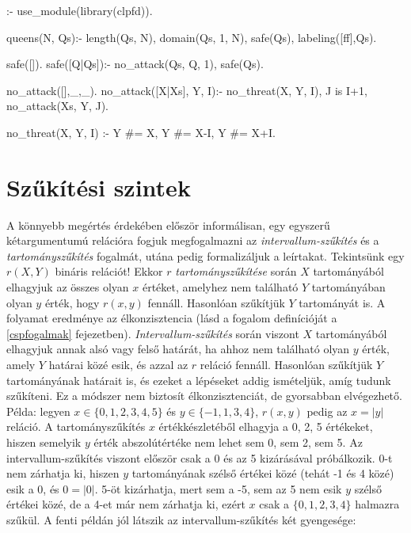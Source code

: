 \begin{prologcode}
:- use_module(library(clpfd)).

queens(N, Qs):-
  length(Qs, N), domain(Qs, 1, N),
  safe(Qs),
  labeling([ff],Qs).  %

safe([]).
safe([Q|Qs]):-
  no_attack(Qs, Q, 1),
  safe(Qs).

no_attack([],_,_).
no_attack([X|Xs], Y, I):-
  no_threat(X, Y, I),
  J is I+1, no_attack(Xs, Y, J).

no_threat(X, Y, I) :-
  Y #= X, Y #= X-I, Y #= X+I.
\end{prologcode}



\section{Szűkítési szintek}
\label{szukites}

A könnyebb megértés érdekében először informálisan, egy egyszerű
kétargumentumú relációra fogjuk megfogalmazni az \emph{intervallum-szűkítés}
és a \emph{tartományszűkítés} fogalmát, utána pedig formalizáljuk a
leírtakat.
\br
Tekintsünk egy $r(X,Y)$ bináris relációt! Ekkor $r$ \emph{tartományszűkítése}
során $X$ tartományából elhagyjuk az összes olyan $x$ értéket, amelyhez nem
található $Y$ tartományában olyan $y$ érték, hogy $r(x,y)$ fennáll. Hasonlóan
szűkítjük $Y$ tartományát is. A folyamat eredménye az élkonzisztencia (lásd
a fogalom definícióját a \ref{cspfogalmak} fejezetben).
\emph{Intervallum-szűkítés} során viszont $X$ tartományából elhagyjuk annak
alsó vagy felső határát, ha ahhoz nem található olyan $y$ érték, amely $Y$
határai közé esik, és azzal az $r$ reláció fennáll. Hasonlóan szűkítjük
$Y$ tartományának határait is, és ezeket a lépéseket addig ismételjük,
amíg tudunk szűkíteni. Ez a módszer nem biztosít élkonzisztenciát, de
gyorsabban elvégezhető.
\br
Példa: legyen $x \in \{0,1,2,3,4,5\}$ és $y \in \{-1,1,3,4\}$, $r(x,y)$ pedig
az $x=|y|$ reláció. A tartományszűkítés $x$ értékkészletéből elhagyja
a 0, 2, 5 értékeket, hiszen semelyik $y$ érték abszolútértéke nem lehet
sem 0, sem 2, sem 5. Az intervallum-szűkítés viszont először csak a 0
és az 5 kizárásával próbálkozik. 0-t nem zárhatja ki, hiszen $y$ tartományának
szélső értékei közé (tehát -1 és 4 közé) esik a 0, és $0=|0|$. 5-öt
kizárhatja, mert sem a -5, sem az 5 nem esik $y$ szélső értékei közé,
de a 4-et már nem zárhatja ki, ezért $x$ csak a $\{0,1,2,3,4\}$ halmazra
szűkül.
\br
A fenti példán jól látszik az intervallum-szűkítés két gyengesége:

